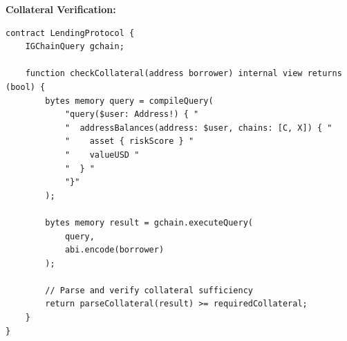 \textbf{Collateral Verification:}
\begin{lstlisting}[language=Solidity, basicstyle=\small\ttfamily]
contract LendingProtocol {
    IGChainQuery gchain;
    
    function checkCollateral(address borrower) internal view returns (bool) {
        bytes memory query = compileQuery(
            "query($user: Address!) { "
            "  addressBalances(address: $user, chains: [C, X]) { "
            "    asset { riskScore } "
            "    valueUSD "
            "  } "
            "}"
        );
        
        bytes memory result = gchain.executeQuery(
            query,
            abi.encode(borrower)
        );
        
        // Parse and verify collateral sufficiency
        return parseCollateral(result) >= requiredCollateral;
    }
}
\end{lstlisting}

